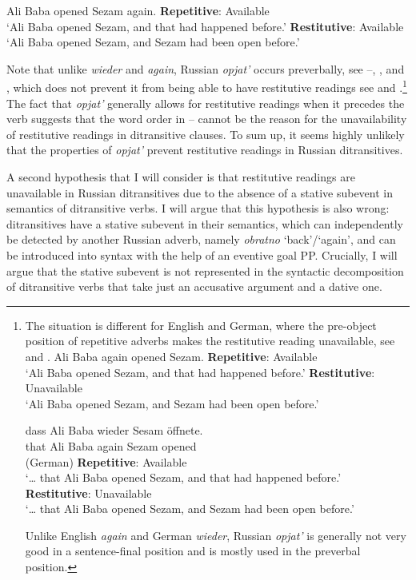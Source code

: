 \documentclass[output=paper]{langscibook}
\begin{document}
 \ea\label{ex:bondarenko:18}
{Ali Baba opened Sezam again.}
\ea \textbf{Repetitive}: Available\\
`Ali Baba opened Sezam, and that had happened before.'
\ex \textbf{Restitutive}: Available\\
`Ali Baba opened Sezam, and Sezam had been open before.'
\z
\z


\noindent Note that unlike \textit{wieder} and \textit{again}, Russian \textit{opjat’} occurs preverbally, see --, , and , which does not prevent it from being able to have restitutive readings see  and .\footnote{The situation is different for English and German, where the pre-object position of repetitive adverbs makes the restitutive reading unavailable, see  and .
  \ea\label{ex:bondarenko:fn8exi}
  {Ali Baba again opened Sezam.}
    \ea \textbf{Repetitive}: Available\\
    `Ali Baba opened Sezam, and that had happened before.'
    \ex \textbf{Restitutive}: Unavailable\\
    `Ali Baba opened Sezam, and Sezam had been open before.'
    \z
    \z
    
  \ea\label{ex:bondarenko:fn8exii}
  \gll {\dots} dass Ali Baba wieder Sesam öffnete.\\
  {} that Ali Baba again Sezam opened\\\hfill (German)
  \ea  \textbf{Repetitive}: Available\\
  `{\dots} that Ali Baba opened Sezam, and that had happened before.'
  \ex \textbf{Restitutive}: Unavailable\\
  `{\dots} that Ali Baba opened Sezam, and Sezam had been open before.'
  \z
  \z
  
\noindent Unlike English \textit{again} and German \textit{wieder}, Russian \textit{opjat’} is generally not very good in a sentence-final position and is mostly used in the preverbal position.} The fact that \textit{opjat’} generally allows for restitutive readings when it precedes the verb suggests that the word order in -- cannot be the reason for the unavailability of restitutive readings in ditransitive clauses. To sum up, it seems highly unlikely that the properties of \textit{opjat’} prevent restitutive readings in Russian ditransitives.



A second hypothesis that I will consider is that restitutive readings are unavailable in Russian ditransitives due to the absence of a stative subevent in semantics of ditransitive verbs. I will argue that this hypothesis is also wrong: ditransitives have a stative subevent in their semantics, which can independently be detected by another Russian adverb, namely \textit{obratno} ‘back’/‘again’, and can be introduced into syntax with the help of an eventive goal PP. Crucially, I will argue that the stative subevent is not represented in the syntactic decomposition of ditransitive verbs that take just an accusative argument and a dative one.\largerpage[-4]
\end{document}
